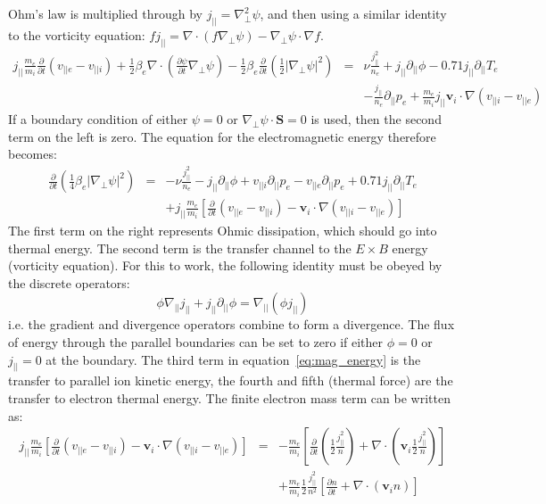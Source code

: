 \documentclass[12pt,a4paper]{article}
\begin{document}
Ohm's law is multiplied through by $j_{||} = \nabla_\perp^2\psi$, and then using a similar identity to the vorticity equation: $fj_{||} = \nabla\cdot\left(f\nabla_\perp\psi\right) - \nabla_\perp\psi\cdot\nabla f$.
\begin{eqnarray*}
j_{||}\frac{m_e}{m_i}\frac{\partial}{\partial t}\left(v_{||e} - v_{||i}\right) + \frac{1}{2}\beta_e\nabla\cdot\left(\frac{\partial\psi}{\partial t}\nabla_\perp\psi\right) - \frac{1}{2}\beta_e\frac{\partial}{\partial t}\left(\frac{1}{2}\left|\nabla_\perp\psi\right|^2\right) &=& \nu \frac{j_{||}^2}{n_e} + j_{||}\partial_{||}\phi - 0.71j_{||}\partial_{||}T_e \\
&&- \frac{j_{||}}{n_e}\partial_{||}p_e + \frac{m_e}{m_i}j_{||}\mathbf{v}_i\cdot\nabla\left(v_{||i} - v_{||e}\right)
\end{eqnarray*}
If a boundary condition of either $\psi = 0$ or $\nabla_\perp\psi\cdot\mathbf{S} = 0$ is used, then the second term on the left is zero. The equation for the electromagnetic energy therefore becomes:
\begin{eqnarray}
\frac{\partial}{\partial t}\left(\frac{1}{4}\beta_e\left|\nabla_\perp\psi\right|^2\right) &=& - \nu \frac{j_{||}^2}{n_e} - j_{||}\partial_{||}\phi + v_{||i}\partial_{||}p_e - v_{||e}\partial_{||}p_e + 0.71j_{||}\partial_{||}T_e \nonumber \\
&&+ j_{||}\frac{m_e}{m_i}\left[\frac{\partial}{\partial t}\left(v_{||e} - v_{||i}\right) - \mathbf{v}_i\cdot\nabla\left(v_{||i} - v_{||e}\right)\right]
\label{eq:mag_energy}
\end{eqnarray}
The first term on the right represents Ohmic dissipation, which should go into thermal energy. The second term is the transfer channel to the $E\times B$ energy (vorticity equation). For this to work, the following identity must be obeyed by the discrete operators:
\begin{equation}
\phi\nabla_{||}j_{||} + j_{||}\partial_{||}\phi = \nabla_{||}\left(\phi j_{||}\right)
\end{equation}
i.e. the gradient and divergence operators combine to form a divergence. The flux of energy through the parallel boundaries can be set to zero if either $\phi=0$ or $j_{||}=0$ at the boundary.
The third term in equation~\ref{eq:mag_energy} is the transfer to parallel ion kinetic energy, the fourth and fifth (thermal force) are the transfer to electron thermal energy. The finite electron mass term can be written as:
\begin{eqnarray*}
j_{||}\frac{m_e}{m_i}\left[\frac{\partial}{\partial t}\left(v_{||e} - v_{||i}\right) - \mathbf{v}_i\cdot\nabla\left(v_{||i} - v_{||e}\right)\right] &=& -\frac{m_e}{m_i}\left[\frac{\partial}{\partial t}\left(\frac{1}{2}\frac{j_{||}^2}{n}\right) + \nabla\cdot\left(\mathbf{v}_i\frac{1}{2}\frac{j_{||}^2}{n}\right)\right] \\
&& + \frac{m_e}{m_i}\frac{1}{2}\frac{j_{||}^2}{n^2}\left[\frac{\partial n}{\partial t} + \nabla\cdot\left(\mathbf{v}_i n\right) \right]
\end{eqnarray*}
\end{document}
